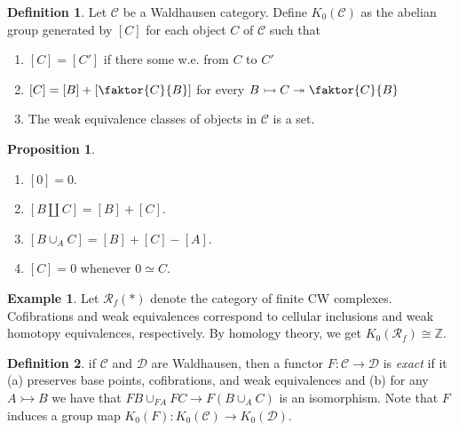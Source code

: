 \documentclass[10pt,letterpaper,cm]{nupset}
\theoremstyle{definition}
\newtheorem*{definition}{Definition}
\newtheorem{exmp}{Example}
\newtheorem{prop}{Proposition}
\newcommand{\Z}{\mathbb Z}
\newcommand{\1}{\mathbf{1}}
\renewcommand{\c}{\mathscr{C}}
\renewcommand{\d}{\mathscr{D}}
\newcommand{\0}{\vec 0}
\begin{document}
\begin{definition}
Let $\c$ be a Waldhausen category. Define $K_0(\c)$ as the abelian group generated by $[C]$ for each object $C$ of $\c$ such that
\begin{enumerate}
\item $[C] = [C']$ if there some w.e. from $C$ to $C'$
\item $[C] = [B] + [\faktor{C}{B}]$ for every $B \rightarrowtail  C \twoheadrightarrow \faktor{C}{B}$
\item The weak equivalence classes of objects in $\c$ is a set.
\end{enumerate}
\end{definition}

\begin{prop} $ $
\begin{enumerate}
\item $[0] = 0$.
\item $[B \coprod C] = [B] +[C]$.
\item $[B \cup_A C] = [B]+[C]-[A]$.
\item $[C]= 0$ whenever $0 \simeq C$.
\end{enumerate}
\end{prop}

\begin{exmp}
Let $\mathcal{R}_f(\ast)$ denote the category of finite CW complexes. Cofibrations and weak equivalences correspond to cellular inclusions  and weak homotopy equivalences, respectively. By homology theory, we get $K_0(\mathcal{R}_f) \cong \Z$.
\end{exmp}

\begin{definition}
if $\c$ and $\d$ are Waldhausen, then a functor $F: \c \to \d$ is \textit{exact} if it (a) preserves base points, cofibrations, and weak equivalences and (b) for any $A \rightarrowtail B$ we have that $FB \cup_{FA} FC \to F(B\cup_A C)$ is an isomorphism. Note that $F$ induces a group map $K_0(F) :K_0(\c) \to K_0(\d)$.
\end{definition}
\end{document}
